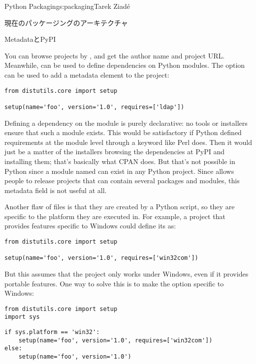 \begin{aosachapter}{Python Packaging}{s:packaging}{Tarek Ziad\'{e}}
\begin{aosasect1}{現在のパッケージングのアーキテクチャ}
\begin{aosasect2}{MetadataとPyPI}

You can browse projects by , and get the author name
and project URL\@.  Meanwhile,  can be used to define
dependencies on Python modules.  The  option can be
used to add a  metadata element to the project:

\begin{verbatim}
from distutils.core import setup

setup(name='foo', version='1.0', requires=['ldap'])
\end{verbatim}

Defining a dependency on the  module is purely declarative:
no tools or installers ensure that such a module exists.  This would be
satisfactory if Python defined requirements at the module level
through a  keyword like Perl does.  Then it would
just be a matter of the installers browsing the dependencies at PyPI
and installing them; that's basically what CPAN does.  But that's not
possible in Python since a module named  can exist in any
Python project. Since  allows people to release
projects that can contain several packages and modules, this metadata
field is not useful at all.

Another flaw of  files is that they are created by a
Python script, so they are specific to the platform they are executed
in.  For example, a project that provides features specific to Windows
could define its  as:

\begin{verbatim}
from distutils.core import setup

setup(name='foo', version='1.0', requires=['win32com'])
\end{verbatim}

\noindent But this assumes that the project only works under Windows, even if it
provides portable features.  One way to solve this is to make the
 option specific to Windows:

\begin{verbatim}
from distutils.core import setup
import sys
\end{verbatim}
\begin{verbatim}
if sys.platform == 'win32':
    setup(name='foo', version='1.0', requires=['win32com'])
else:
    setup(name='foo', version='1.0')
\end{verbatim}


\end{aosasect2}
\end{aosasect1}
\end{aosachapter}
